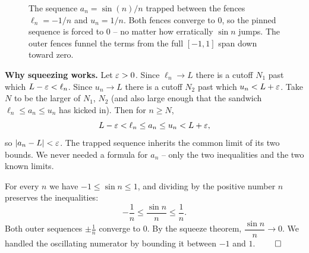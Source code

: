 \begin{figure}[H]
\centering
{}
\caption{The sequence $a_n = \sin(n)/n$ trapped between the fences $\ell_n =
-1/n$ and $u_n = 1/n$. Both fences converge to $0$, so the pinned sequence is
forced to $0$ -- no matter how erratically $\sin n$ jumps. The outer fences
funnel the terms from the full $[-1,1]$ span down toward zero.}
\label{ch28:fig-squeeze}
\end{figure}

\begin{whybox}
\textbf{Why squeezing works.} Let $\varepsilon > 0$. Since $\ell_n \to L$ there is a
cutoff $N_1$ past which $L - \varepsilon < \ell_n$. Since $u_n \to L$ there is a cutoff
$N_2$ past which $u_n < L + \varepsilon$. Take $N$ to be the larger of $N_1$, $N_2$ (and
also large enough that the sandwich $\ell_n \le a_n \le u_n$ has kicked in). Then
for $n \ge N$,
\[
  L - \varepsilon < \ell_n \le a_n \le u_n < L + \varepsilon,
\]
so $\lvert a_n - L\rvert < \varepsilon$. The trapped sequence inherits the common limit of its
two bounds. We never needed a formula for $a_n$ -- only the two inequalities
and the two known limits.
\end{whybox}

\begin{example}[$\sin n / n \to 0$]
\label{ch28:ex-sinn}
For every $n$ we have $-1 \le \sin n \le 1$, and dividing by the positive number
$n$ preserves the inequalities:
\[
  -\frac1n \le \frac{\sin n}{n} \le \frac1n .
\]
Both outer sequences $\pm\tfrac1n$ converge to $0$. By the squeeze theorem,
$\dfrac{\sin n}{n} \to 0$. We handled the oscillating numerator by bounding it
between $-1$ and $1$. $\qed$
\end{example}

